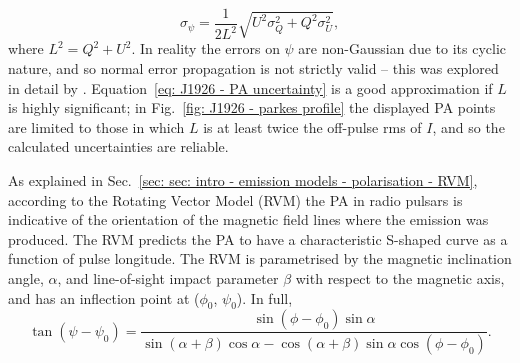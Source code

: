 \begin{equation}
    \label{eq: J1926 - PA uncertainty}
    \sigma_\psi = \frac{1}{2L^2}\sqrt{U^2\sigma_Q^2 + Q^2\sigma_U^2},
\end{equation}
where $L^2 = Q^2 + U^2$.  In reality the errors on $\psi$ are non-Gaussian due to its cyclic nature, and so normal error propagation is not strictly valid -- this was explored in detail by \citet{NCxx1993}. Equation~\eqref{eq: J1926 - PA uncertainty} is a good approximation if $L$ is highly significant; in Fig.~\ref{fig: J1926 - parkes profile} the displayed PA points are limited to those in which $L$ is at least twice the off-pulse rms of $I$, and so the calculated uncertainties are reliable.

As explained in Sec.~\ref{sec: sec: intro - emission models - polarisation - RVM}, according to the Rotating Vector Model (RVM) the PA  in radio pulsars is indicative of the orientation of the magnetic field lines where the emission was produced. The RVM predicts the PA to have a characteristic S-shaped curve as a function of pulse longitude. The RVM is parametrised by the magnetic inclination angle, $\alpha$, and line-of-sight impact parameter $\beta$ with respect to the magnetic axis, and has an inflection point at ($\phi_0$, $\psi_0$). In full,
\begin{equation}
    \tan(\psi - \psi_0) = \frac{\sin(\phi-\phi_0)\sin\alpha}{\sin(\alpha+\beta)\cos\alpha-\cos(\alpha+\beta)\sin\alpha\cos(\phi-\phi_0)}.
    \label{eq: J1926 - RVM}
\end{equation}

